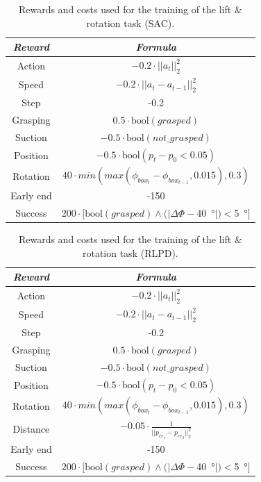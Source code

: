\documentclass[letterpaper, 10 pt, conference]{ieeeconf}  %
\begin{document}
\begin{table}[H]
    \centering
    \caption{Rewards and costs used for the training of the lift \& rotation task (SAC).}
    \renewcommand{\arraystretch}{1.5}
    \begin{tabular}{c|c}
    \toprule \textbf{\textit{Reward}} & \textbf{\textit{Formula}}\\
    \midrule Action & $-0.2\cdot || a_{t} ||^2_2$\\
    Speed & $-0.2\cdot || a_t - a_{t-1}||^2_2$\\
    Step & -0.2\\
    Grasping & $0.5\cdot \text{bool}(grasped)$\\
    Suction & $-0.5\cdot \text{bool}(not\_grasped)$\\
    Position & $-0.5\cdot \text{bool}(p_t-p_0<0.05)$\\
    Rotation & $40\cdot min(max(\phi_{box_t} - \phi_{box_{t-1}}, 0.015), 0.3)$\\
    Early end & -150\\
    Success & $200\cdot [\text{bool}(grasped)\land (|\Delta\Phi-$\SI{40}{\degree}$|)<$\SI{5}{\degree}$]$ \\
    \bottomrule
    \end{tabular}
    \label{inair_sac_rew}
\end{table}

\begin{table}[H]
    \centering
    \caption{Rewards and costs used for the training of the lift \& rotation task (RLPD).}
    \renewcommand{\arraystretch}{1.5}
    \begin{tabular}{c|c}
    \toprule \textbf{\textit{Reward}} & \textbf{\textit{Formula}}\\
    \midrule Action & $-0.2\cdot || a_{t} ||^2_2$\\
    Speed & $-0.2\cdot || a_t - a_{t-1}||^2_2$\\
    Step & -0.2\\
    Grasping & $0.5\cdot \text{bool}(grasped)$\\
    Suction & $-0.5\cdot \text{bool}(not\_grasped)$\\
    Position & $-0.5\cdot \text{bool}(p_t-p_0<0.05)$\\
    Rotation & $40\cdot min(max(\phi_{box_t} - \phi_{box_{t-1}}, 0.015), 0.3)$\\
    Distance & $-0.05\cdot \frac{1}{||p_{ee_1} - p_{ee_2}||^2_2}$\\
    Early end & -150\\
    Success & $200\cdot [\text{bool}(grasped)\land (|\Delta\Phi-$\SI{40}{\degree}$|)<$\SI{5}{\degree}$]$ \\
    \bottomrule
    \end{tabular}
    \label{inair_drq_rew}
\end{table}
\end{document}
